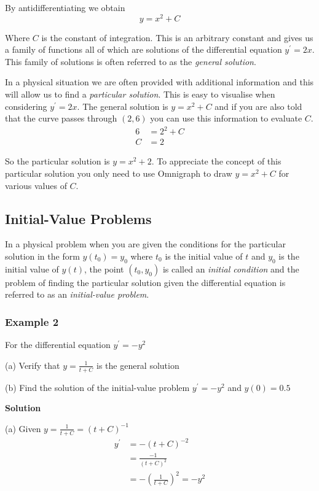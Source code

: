 By antidifferentiating we obtain
\begin{equation*}y =x^{2} +C
\end{equation*}

Where $C$ is the constant of integration.  This is an arbitrary constant and gives us a family
of functions all of which are solutions of the differential equation $y^{ \prime } =2 x$.  This family of solutions is often referred to as the \emph{general solution}.


In a physical situation we are often provided with additional information and this will allow us to find a \emph{particular
solution}.  This is easy to visualise when considering $y^{ \prime } =2 x\text{.}$  The general solution is $y =x^{2} +C$ and if you are also told that the curve passes through $\left (2 ,6\right )$ you can use this information to evaluate $C\text{.}$
\begin{align*}6 &    = 2^{2} +C \\
C &    = 2\end{align*}

So the particular solution is $y =x^{2} +2$.  To appreciate the concept of this particular solution you only need to use Omnigraph to
draw $y =x^{2} +C$ for various values of $C$. 

\subsection{Initial-Value Problems}
In a physical problem when you are given the conditions for the particular solution in the form $y (t_{0}) =y_{0}$ where $t_{0}$ is the initial value of $t$ and $y_{0}$ is the initial value of $y (t)$, the point $\left (t_{0} ,y_{0}\right )$ is called an \emph{initial condition} and the
problem of finding the particular solution given the differential equation is referred to as an \emph{initial-value problem}. 

\subsubsection{Example 2}
For the differential equation $y^{ \prime } = -y^{2}$ 

(a) Verify that $y =\frac{1}{t +C}$ is the general solution 

(b) Find the solution of the initial-value problem $y^{ \prime } = -y^{2}$ and $y \left (0\right ) =0.5$ 

\textbf{Solution} 

(a) Given $y =\frac{1}{t +C} =\left (t +C\right )^{ -1}$
\begin{align*}y^{ \prime } &    =  -\left (t +C\right )^{ -2} \\
 &    = \frac{ -1}{\left (t +C\right )^{2}} \\
 &    =  -\genfrac{(}{)}{}{}{1}{t +C}^{2} = -y^{2}\end{align*}

